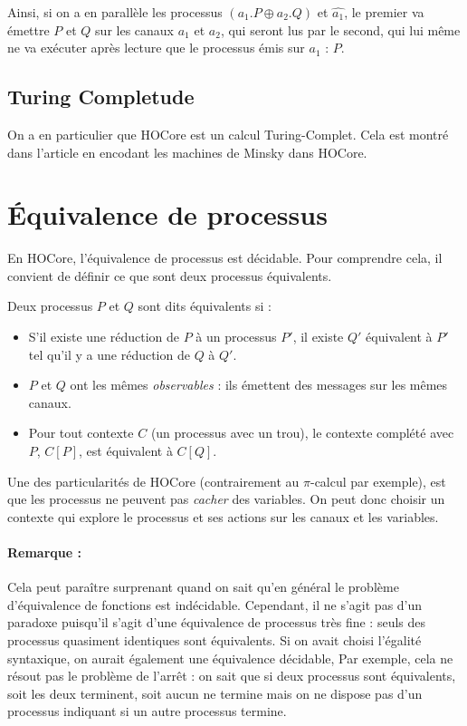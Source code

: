 \documentclass[11pt]{article}
\def\pic{$\pi$-calcul }
\def\+{\oplus}
\begin{document}
Ainsi, si on a en parallèle les processus $(a_1.P\+ a_2.Q)$ et  $\hat{a_1}$, le premier va émettre $P$ et $Q$ sur les canaux $a_1$ et $a_2$, qui seront lus par le second, qui lui même ne va exécuter après lecture que le processus émis sur $a_1$ : $P$. 

\subsection{Turing Completude}
On a en particulier que HOCore est un calcul Turing-Complet.
Cela est montré dans l'article \cite{expressiveness} en encodant les machines de Minsky dans HOCore.


\section{Équivalence de processus}
En HOCore, l'équivalence de processus est décidable. Pour comprendre cela, il convient de définir ce que sont deux processus équivalents.

Deux processus $P$ et $Q$ sont dits équivalents si :
\begin{itemize}
\item S'il existe une réduction de $P$ à un processus $P'$, il existe $Q'$ équivalent à $P'$ tel qu'il y a une réduction de $Q$ à $Q'$. 
\item $P$ et $Q$ ont les mêmes \textit{observables} : ils émettent des messages sur les mêmes canaux.  
\item Pour tout contexte $C$ (un processus avec un trou), le contexte complété avec $P$, $C[P]$, est équivalent à $C[Q]$.
\end{itemize}
Une des particularités de HOCore (contrairement au \pic par exemple), est que les processus ne peuvent pas \textit{cacher} des variables. On peut donc choisir un contexte qui explore le processus et ses actions sur les canaux et les variables. 


\paragraph{Remarque :} Cela peut paraître surprenant quand on sait qu'en général le problème d'équivalence de fonctions est indécidable. Cependant, il ne s'agit pas d'un paradoxe puisqu'il s'agit d'une équivalence de processus très fine : seuls des processus quasiment identiques sont équivalents. Si on avait choisi l'égalité syntaxique, on aurait également une équivalence décidable,  Par exemple, cela ne résout pas le problème de l'arrêt : on sait que si deux processus sont équivalents, soit les deux terminent, soit aucun ne termine mais on ne dispose pas d'un processus indiquant si un autre processus termine. 
\end{document}
